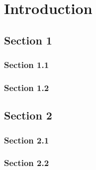 \chapter{Introduction}
\label{chp:introduction}
\lipsum[1]
  \section{Section 1}
  \lipsum[2-4]
  \subsection{Section 1.1}
    \lipsum[5-6]
  \subsection{Section 1.2}
    \lipsum[5-6]
\section{Section 2}
  \lipsum[2-4]
  \subsection{Section 2.1}
    \lipsum[5-6]
  \subsection{Section 2.2}
    \lipsum[5-6]



